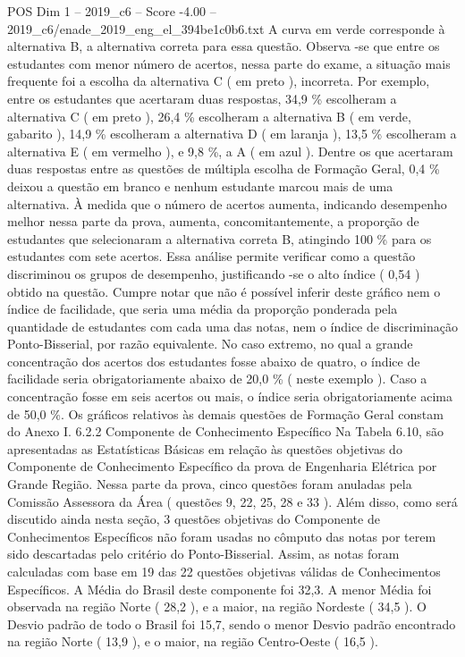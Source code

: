 \begin{textsample}{POS Dim 1 – 2019\_c6 – Score -4.00 – 2019\_c6/enade\_2019\_eng\_el\_394be1c0b6.txt}
A curva em verde corresponde à alternativa B, a alternativa correta para essa questão.
Observa -se que entre os estudantes com menor número de acertos, nessa parte do exame, a situação mais frequente foi a escolha da alternativa C ( em preto ), incorreta.
Por exemplo, entre os estudantes que acertaram duas respostas, 34,9 \% escolheram a alternativa C ( em preto ), 26,4 \% escolheram a alternativa B ( em verde, gabarito ), 14,9 \% escolheram a alternativa D ( em laranja ), 13,5 \% escolheram a alternativa E ( em vermelho ), e 9,8 \%, a A ( em azul ).
Dentre os que acertaram duas respostas entre as questões de múltipla escolha de Formação Geral, 0,4 \% deixou a questão em branco e nenhum estudante marcou mais de uma alternativa.
À medida que o número de acertos aumenta, indicando desempenho melhor nessa parte da prova, aumenta, concomitantemente, a proporção de estudantes que selecionaram a alternativa correta B, atingindo 100 \% para os estudantes com sete acertos.
Essa análise permite verificar como a questão discriminou os grupos de desempenho, justificando -se o alto índice ( 0,54 ) obtido na questão.
Cumpre notar que não é possível inferir deste gráfico nem o índice de facilidade, que seria uma média da proporção ponderada pela quantidade de estudantes com cada uma das notas, nem o índice de discriminação Ponto-Bisserial, por razão equivalente.
No caso extremo, no qual a grande concentração dos acertos dos estudantes fosse abaixo de quatro, o índice de facilidade seria obrigatoriamente abaixo de 20,0 \% ( neste exemplo ).
Caso a concentração fosse em seis acertos ou mais, o índice seria obrigatoriamente acima de 50,0 \%.
Os gráficos relativos às demais questões de Formação Geral constam do Anexo I. 6.2.2 Componente de Conhecimento Específico Na Tabela 6.10, são apresentadas as Estatísticas Básicas em relação às questões objetivas do Componente de Conhecimento Específico da prova de Engenharia Elétrica por Grande Região.
Nessa parte da prova, cinco questões foram anuladas pela Comissão Assessora da Área ( questões 9, 22, 25, 28 e 33 ).
Além disso, como será discutido ainda nesta seção, 3 questões objetivas do Componente de Conhecimentos Específicos não foram usadas no cômputo das notas por terem sido descartadas pelo critério do Ponto-Bisserial.
Assim, as notas foram calculadas com base em 19 das 22 questões objetivas válidas de Conhecimentos Específicos.
A Média do Brasil deste componente foi 32,3.
A menor Média foi observada na região Norte ( 28,2 ), e a maior, na região Nordeste ( 34,5 ).
O Desvio padrão de todo o Brasil foi 15,7, sendo o menor Desvio padrão encontrado na região Norte ( 13,9 ), e o maior, na região Centro-Oeste ( 16,5 ).

\end{textsample}
